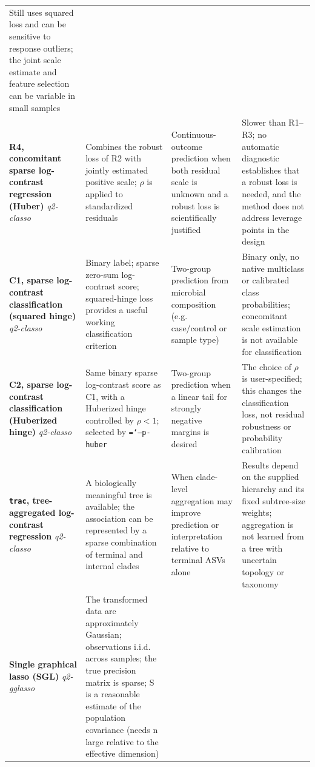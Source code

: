 \documentclass[11pt,a4paper]{article}
\newcommand{\code}[1]{\allowbreak\texttt{\hyphenchar\font=`\-\relax #1}}
\begin{document}
\begin{landscape}
\begin{small}
\begin{longtable}{@{}p{3.2cm}p{6.2cm}p{4.6cm}p{6.4cm}@{}}
Still uses squared loss and can be sensitive to response outliers; the joint scale estimate and feature selection can be variable in small samples \\
\addlinespace
\textbf{R4, concomitant sparse log-contrast regression (Huber)} \newline \textit{q2-classo} &
Combines the robust loss of R2 with jointly estimated positive scale; $\rho$ is applied to standardized residuals &
Continuous-outcome prediction when both residual scale is unknown and a robust loss is scientifically justified &
Slower than R1--R3; no automatic diagnostic establishes that a robust loss is needed, and the method does not address leverage points in the design \\
\addlinespace
\textbf{C1, sparse log-contrast classification (squared hinge)} \newline \textit{q2-classo} &
Binary label; sparse zero-sum log-contrast score; squared-hinge loss provides a useful working classification criterion &
Two-group prediction from microbial composition (e.g. case/control or sample type) &
Binary only, no native multiclass or calibrated class probabilities; concomitant scale estimation is not available for classification \\
\addlinespace
\textbf{C2, sparse log-contrast classification (Huberized hinge)} \newline \textit{q2-classo} &
Same binary sparse log-contrast score as C1, with a Huberized hinge controlled by $\rho<1$; selected by \code{--p-huber} &
Two-group prediction when a linear tail for strongly negative margins is desired &
The choice of $\rho$ is user-specified; this changes the classification loss, not residual robustness or probability calibration \\
\addlinespace
\textbf{\texttt{trac}, tree-aggregated log-contrast regression} \newline \textit{q2-classo} &
A biologically meaningful tree is available; the association can be represented by a sparse combination of terminal and internal clades &
When clade-level aggregation may improve prediction or interpretation relative to terminal ASVs alone &
Results depend on the supplied hierarchy and its fixed subtree-size weights; aggregation is not learned from a tree with uncertain topology or taxonomy \\
\addlinespace
\textbf{Single graphical lasso (SGL)} \newline \textit{q2-gglasso} &
The transformed data are approximately Gaussian; observations i.i.d. across samples; the true precision matrix is sparse; S is a reasonable estimate of the population covariance (needs n large relative to the effective dimension) &

\end{longtable}
\end{small}
\end{landscape}
\end{document}
